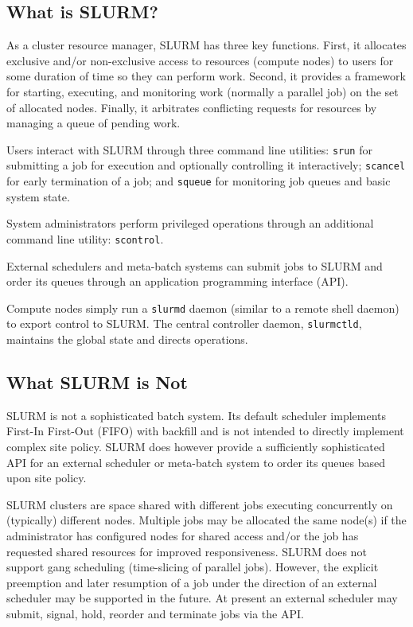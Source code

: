 \subsection{What is SLURM?}

As a cluster resource manager, SLURM has three key functions.  First,
it allocates exclusive and/or non-exclusive access to resources (compute nodes) to users for 
some duration of time so they can perform work.  Second, it provides 
a framework for starting, executing, and monitoring work (normally a 
parallel job) on the set of allocated nodes.  Finally, it arbitrates 
conflicting requests for resources by managing a queue of pending work.

Users interact with SLURM through three command line utilities: 
{\tt srun} for submitting a job for execution and optionally controlling it
interactively; 
{\tt scancel} for early termination of a job; 
and {\tt squeue} for monitoring job queues and basic system state.

System administrators perform privileged operations through an additional
command line utility: {\tt scontrol}.

External schedulers and meta-batch systems can submit jobs to SLURM and
order its queues through an application programming interface (API).

Compute nodes simply run a {\tt slurmd} daemon (similar to a remote shell 
daemon) to export control to SLURM.  The central controller daemon,
{\tt slurmctld}, maintains the global state and directs operations.

\subsection{What SLURM is Not}

SLURM is not a sophisticated batch system.  Its default scheduler
implements First-In First-Out (FIFO) with backfill and is not 
intended to directly implement complex site policy.
SLURM does however provide a sufficiently sophisticated API for an external 
scheduler or meta-batch system to order its queues based upon site policy.

SLURM clusters are space shared with different jobs executing 
concurrently on (typically) different nodes. 
Multiple jobs may be allocated the same node(s) 
if the administrator has configured nodes for shared access and/or 
the job has requested shared resources for improved responsiveness.
SLURM does not support gang scheduling (time-slicing 
of parallel jobs). However, the explicit preemption and later resumption 
of a job under the direction of an external scheduler may be supported 
in the future. At present an external scheduler may submit, signal, hold, 
reorder and terminate jobs via the API.

